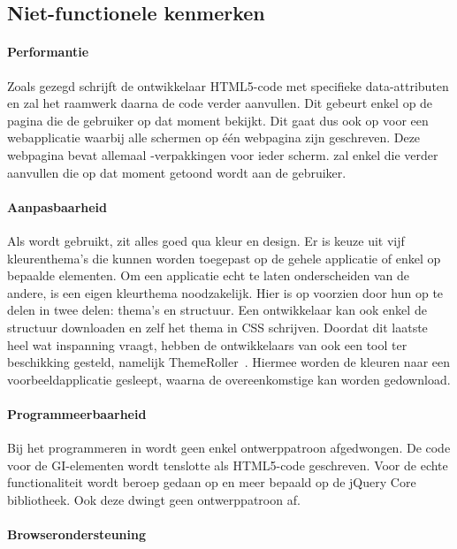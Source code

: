 \subsection{Niet-functionele kenmerken}
\paragraph{Performantie}
Zoals gezegd schrijft de ontwikkelaar HTML5-code met specifieke data-attributen en zal het raamwerk daarna de code verder aanvullen. 
Dit gebeurt enkel op de pagina die de gebruiker op dat moment bekijkt. 
Dit gaat dus ook op voor een webapplicatie waarbij alle schermen op één webpagina zijn geschreven. 
Deze webpagina bevat allemaal -verpakkingen voor ieder scherm. 
\jqm{} zal enkel die  verder aanvullen die op dat moment getoond wordt aan de gebruiker. 

\paragraph{Aanpasbaarheid}
Als \jqm{}  wordt gebruikt, zit alles goed qua kleur en design. 
Er is keuze uit vijf kleurenthema's die kunnen worden toegepast op de gehele applicatie of enkel op bepaalde elementen. 
Om een applicatie echt te laten onderscheiden van de andere, is een eigen kleurthema noodzakelijk. 
Hier is \jqm{} op voorzien door hun  op te delen in twee delen: thema's en structuur. 
Een ontwikkelaar kan ook enkel de structuur downloaden en zelf het thema in CSS schrijven. 
Doordat dit laatste heel wat inspanning vraagt, hebben de ontwikkelaars van \jqm{} ook een tool ter beschikking gesteld, namelijk ThemeRoller~\cite{JQuery2012c}. 
Hiermee worden de kleuren naar een voorbeeldapplicatie gesleept, waarna de overeenkomstige  kan worden gedownload.

\paragraph{Programmeerbaarheid}
Bij het programmeren in \jqm{} wordt geen enkel ontwerppatroon afgedwongen. 
De code voor de GI-elementen wordt tenslotte als HTML5-code geschreven. 
Voor de echte functionaliteit wordt beroep gedaan op \js{} en meer bepaald op de jQuery Core bibliotheek. 
Ook deze dwingt geen ontwerppatroon af.

\paragraph{Browserondersteuning}
\label{sec:jqm-browser-support}


